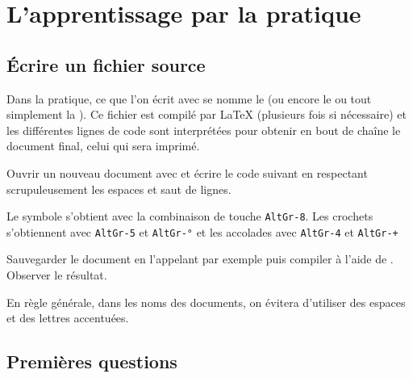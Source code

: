 \documentclass[10pt,french]{book}
\begin{document}
\thispagestyle{empty}

\section{L'apprentissage par la pratique}
\subsection{\'Ecrire un fichier source}

Dans la pratique, ce que l'on écrit avec \texstudio se nomme le  (ou encore le  ou tout simplement la ). Ce fichier est compilé par \LaTeX{} (plusieurs fois si nécessaire) et les différentes lignes de code sont interprétées pour obtenir en bout de chaîne le document final, celui qui sera imprimé.\medskip

Ouvrir un nouveau document avec \texstudio et écrire le code suivant en respectant scrupuleusement les espaces et saut de lignes.

\begin{info}
    Le symbole \tbs s'obtient avec la combinaison de touche {\tt AltGr-8}. Les crochets s'obtiennent avec  {\tt AltGr-5} et  {\tt AltGr-°} et les accolades avec  {\tt AltGr-4} et  {\tt AltGr-+}
\end{info}\medskip


Sauvegarder le document en l'appelant par exemple  puis compiler à l'aide de . Observer le résultat.\medskip

\begin{info}
    En règle générale, dans les noms des documents, on évitera d'utiliser des espaces et des lettres accentuées.
\end{info}

\subsection{Premières questions}
\end{document}
